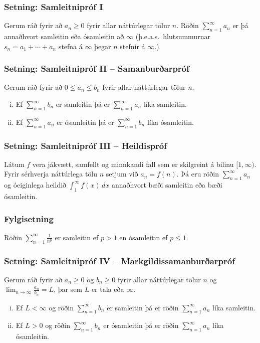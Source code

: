 \documentclass[icelandic,a4paper,12pt]{article}
\begin{document}
\subsubsection{Setning: Samleitnipróf I} 
Gerum ráð fyrir að $a_n\geq 0$ fyrir allar náttúrlegar tölur $n$. 
Röðin $\sum_{n=1}^\infty a_n$ er þá annaðhvort samleitin eða 
ósamleitin að $\infty$ (þ.e.a.s.~hlutsummurnar $s_n=a_1+\cdots+a_n$ stefna á
$\infty$ þegar $n$ stefnir á $\infty$.)

\subsubsection{Setning: Samleitnipróf II -- Samanburðarpróf} 
Gerum ráð fyrir að $0\leq a_n\leq b_n$ fyrir allar náttúrlegar tölur
$n$.  
\begin{enumerate}[(i)]
\item Ef $\sum_{n=1}^\infty b_n$ er samleitin þá er 
$\sum_{n=1}^\infty a_n$ líka samleitin. 
\item Ef $\sum_{n=1}^\infty a_n$ er ósamleitin þá er 
$\sum_{n=1}^\infty b_n$ líka ósamleitin.
\end{enumerate}

\subsubsection{Setning: Samleitnipróf III -- Heildispróf}
Látum $f$ vera jákvætt, samfellt og minnkandi fall sem er skilgreint á
bilinu $[1, \infty)$.   Fyrir sérhverja náttúrlega tölu $n$ setjum við
$a_n=f(n)$.  Þá eru röðin $\sum_{n=1}^\infty a_n$ og óeiginlega
heildið $\int_1^\infty f(x)\,dx$ annaðhvort bæði samleitin eða bæði
ósamleitin. 

\subsubsection{Fylgisetning}
Röðin $\sum_{n=1}^\infty\frac{1}{n^{p}}$ er samleitin ef $p>1$ en 
ósamleitin ef $p\leq 1$.

\subsubsection{Setning: Samleitnipróf IV -- Markgildissamanburðarpróf}
Gerum ráð fyrir að $a_n\geq 0$ og $b_n\geq 0$ fyrir allar náttúrlegar
tölur $n$ og $\lim_{n\rightarrow\infty}\frac{a_n}{b_n}=L$, þar sem
$L$ er tala eða $\infty$. 
\begin{enumerate}[(i)]
\item Ef $L<\infty$ og  röðin 
$\sum_{n=1}^\infty b_n$ er samleitin þá er 
röðin $\sum_{n=1}^\infty a_n$ líka samleitin. 
\item Ef $L>0$ og  röðin 
$\sum_{n=1}^\infty b_n$ er ósamleitin þá er 
röðin $\sum_{n=1}^\infty a_n$ líka ósamleitin.
\end{enumerate}
\end{document}
